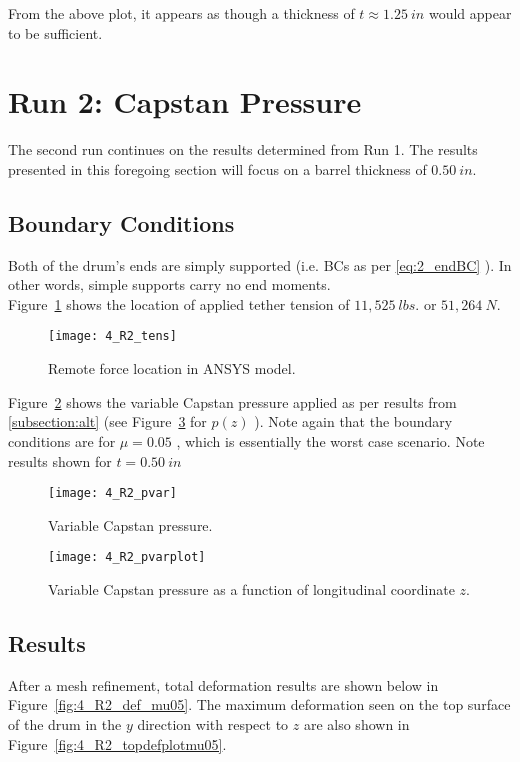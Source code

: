 From the above plot, it appears as though a thickness of $t \approx 1.25 \ in$ would appear to be sufficient.

\section{Run 2: Capstan Pressure}
\label{section:4_R2}
The second run continues on the results determined from Run 1. The results presented in this foregoing section will focus on a barrel thickness of $0.50\ in$.

\subsection{Boundary Conditions}

Both of the drum's ends are simply supported (i.e. BCs as per \ref{eq:2_endBC} ). In other words, simple supports carry no end moments.\\

Figure~\ref{fig:4_R2_tens} shows the location of applied tether tension of $11,525\ lbs.$ or $51,264\ N$.
\begin{figure}[H]
	\centering
	\texttt{[image: 4\_R2\_tens]}
	\caption{Remote force location in ANSYS model.}
	\label{fig:4_R2_tens}
\end{figure}

Figure~\ref{fig:4_R2_pvar} shows the variable Capstan pressure applied as per results from \ref{subsection:alt} (see Figure~\ref{fig:4_R2_pvarplot} for $p(z)$ ). Note again that the boundary conditions are for $\mu=0.05$ , which is essentially the worst case scenario. Note results shown for $t=0.50\ in$

\begin{figure}[H]
	\centering
	\texttt{[image: 4\_R2\_pvar]}
	\caption{Variable Capstan pressure.}
	\label{fig:4_R2_pvar}
\end{figure}
\begin{figure}[H]
	\centering
	\texttt{[image: 4\_R2\_pvarplot]}
	\caption{Variable Capstan pressure as a function of longitudinal coordinate $z$.}
	\label{fig:4_R2_pvarplot}
\end{figure}


\subsection{Results}

After a mesh refinement, total deformation results are shown below in Figure~\ref{fig:4_R2_def_mu05}. The maximum deformation seen on the top surface of the drum in the $y$ direction with respect to $z$ are also shown in Figure~\ref{fig:4_R2_topdefplotmu05}.

